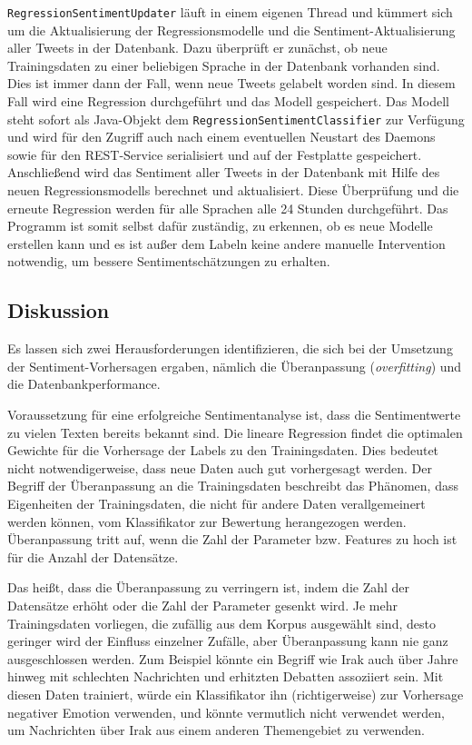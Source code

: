 \label{sentimentupdater}

\texttt{Regression\-Sentiment\-Updater} läuft in einem eigenen Thread und kümmert sich um die Aktualisierung der Regressionsmodelle und die Sentiment-Aktualisierung aller Tweets in der Datenbank. Dazu überprüft er zunächst, ob neue Trainingsdaten zu einer beliebigen Sprache in der Datenbank vorhanden sind. Dies ist immer dann der Fall, wenn neue Tweets gelabelt worden sind. In diesem Fall wird eine Regression durchgeführt und das Modell gespeichert. Das Modell steht sofort als Java-Objekt dem \texttt{Regression\-Sentiment\-Classifier} zur Verfügung und wird für den Zugriff auch nach einem eventuellen Neustart des Daemons sowie für den REST-Service serialisiert und auf der Festplatte gespeichert. Anschließend wird das Sentiment aller Tweets in der Datenbank mit Hilfe des neuen Regressionsmodells berechnet und aktualisiert. Diese Überprüfung und die erneute Regression werden für alle Sprachen alle 24 Stunden durchgeführt. Das Programm ist somit selbst dafür zuständig, zu erkennen, ob es neue Modelle erstellen kann und es ist außer dem Labeln keine andere manuelle Intervention notwendig, um bessere Sentimentschätzungen zu erhalten.

\subsection{Diskussion}

Es lassen sich zwei Herausforderungen identifizieren, die sich bei der Umsetzung der Sentiment-Vorhersagen ergaben, nämlich die Überanpassung (\textit{overfitting}) und die Datenbankperformance. 

Voraussetzung für eine erfolgreiche Sentimentanalyse ist, dass die Sentimentwerte zu vielen Texten bereits bekannt sind. Die lineare Regression findet die optimalen Gewichte für die Vorhersage der Labels zu den Trainingsdaten. Dies bedeutet nicht notwendigerweise, dass neue Daten auch gut vorhergesagt werden. Der Begriff der Überanpassung an die Trainingsdaten beschreibt das Phänomen, dass Eigenheiten der Trainingsdaten, die nicht für andere Daten verallgemeinert werden können, vom Klassifikator zur Bewertung herangezogen werden. Überanpassung tritt auf, wenn die Zahl der Parameter bzw. Features zu hoch ist für die Anzahl der Datensätze.

Das heißt, dass die Überanpassung zu verringern ist, indem die Zahl der Datensätze erhöht oder die Zahl der Parameter gesenkt wird. Je mehr Trainingsdaten vorliegen, die zufällig aus dem Korpus ausgewählt sind, desto geringer wird der Einfluss einzelner Zufälle, aber Überanpassung kann nie ganz ausgeschlossen werden. Zum Beispiel könnte ein Begriff wie Irak auch über Jahre hinweg mit schlechten Nachrichten und erhitzten Debatten assoziiert sein. Mit diesen Daten trainiert, würde ein Klassifikator ihn (richtigerweise) zur Vorhersage negativer Emotion verwenden, und könnte vermutlich nicht verwendet werden, um Nachrichten über Irak aus einem anderen Themengebiet zu verwenden.

